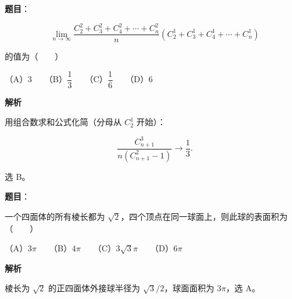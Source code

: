 \begin{answer}

\textbf{题目}：

\nopagebreak[4]
\[
\lim_{n\to\infty}
\frac{C_2^2+C_3^2+C_4^2+\cdots+C_n^2}
n(C_2^1+C_3^1+C_4^1+\cdots+C_n^1)
\]

的值为\mbox{（　　）}

（A）$3$　　（B）$\dfrac13$　　（C）$\dfrac16$　　（D）$6$

\textbf{解析}

用组合数求和公式化简（分母从 $C_2^1$ 开始）：

\nopagebreak[4]
\[
\frac{C_{n+1}^3}{n(C_{n+1}^2-1)}
\longrightarrow\frac13.
\]

选 B。


\end{answer}
\begin{answer}

\textbf{题目}：

一个四面体的所有棱长都为 $\sqrt2$，四个顶点在同一球面上，则此球的表面积为\mbox{（　　）}

（A）$3\pi$　　（B）$4\pi$　　（C）$3\sqrt3\pi$　　（D）$6\pi$

\textbf{解析}

棱长为 $\sqrt2$ 的正四面体外接球半径为 $\sqrt3/2$，球面面积为 $3\pi$，选 A。


\end{answer}

